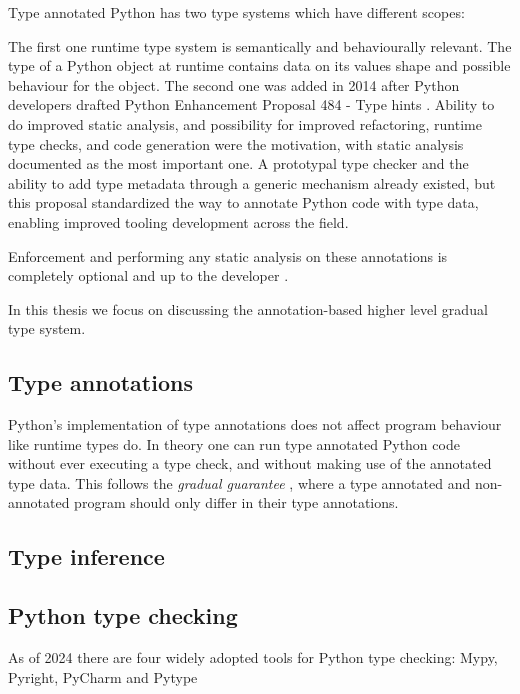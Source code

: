 Type annotated Python has two type systems which have different scopes:

The first one runtime type system is semantically and behaviourally relevant. The type of a Python object at runtime contains data on its values shape and possible behaviour for the object. 
The second one was added in 2014 after Python developers drafted Python Enhancement Proposal 484 - Type hints \cite{pep_484}. Ability to do improved static analysis, and possibility for improved refactoring, runtime type checks, and code generation were the motivation, with static analysis documented as the most important one. A prototypal type checker and the ability to add type metadata through a generic mechanism already existed, but this proposal standardized the way to annotate Python code with type data, enabling improved tooling development across the field.

Enforcement and performing any static analysis on these annotations is completely optional and up to the developer \cite{python_typing}.

In this thesis we focus on discussing the annotation-based higher level gradual type system.

\subsection{Type annotations}
Python's implementation of type annotations does not affect program behaviour like runtime types do. In theory one can run type annotated Python code without ever executing a type check, and without making use of the annotated type data. This follows the \emph{gradual guarantee} \cite{siek_refined_gradual_2015}, where a type annotated and non-annotated program should only differ in their type annotations.

\subsection{Type inference}
 
\subsection{Python type checking}

As of 2024 there are four widely adopted tools for Python type checking: Mypy, Pyright, PyCharm and Pytype %


